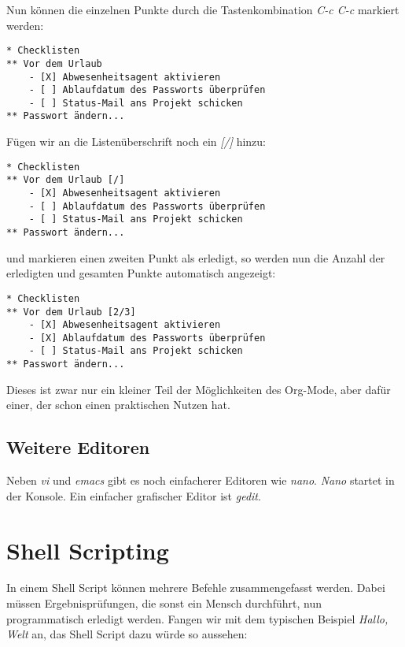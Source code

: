 \documentclass[titlepage,a4paper]{article}
\begin{document}
\noindent
Nun können die einzelnen Punkte durch die Tastenkombination \emph{C-c C-c}
markiert werden:

\begin{verbatim}
* Checklisten
** Vor dem Urlaub
    - [X] Abwesenheitsagent aktivieren
    - [ ] Ablaufdatum des Passworts überprüfen
    - [ ] Status-Mail ans Projekt schicken
** Passwort ändern...
\end{verbatim}

\noindent
Fügen wir an die Listenüberschrift noch ein \emph{[/]} hinzu:

\begin{verbatim}
* Checklisten
** Vor dem Urlaub [/]
    - [X] Abwesenheitsagent aktivieren
    - [ ] Ablaufdatum des Passworts überprüfen
    - [ ] Status-Mail ans Projekt schicken
** Passwort ändern...
\end{verbatim}

\noindent
und markieren einen zweiten Punkt als erledigt,
so werden nun die Anzahl der erledigten und gesamten Punkte automatisch angezeigt:

\begin{verbatim}
* Checklisten
** Vor dem Urlaub [2/3]
    - [X] Abwesenheitsagent aktivieren
    - [X] Ablaufdatum des Passworts überprüfen
    - [ ] Status-Mail ans Projekt schicken
** Passwort ändern...
\end{verbatim}

\noindent
Dieses ist zwar nur ein kleiner Teil der Möglichkeiten des Org-Mode,
aber dafür einer, der schon einen praktischen Nutzen hat.

\subsection{Weitere Editoren}

Neben \emph{vi} und \emph{emacs} gibt es noch einfacherer Editoren wie \emph{nano}.  \emph{Nano} startet
in der Konsole.  Ein einfacher grafischer Editor ist \emph{gedit}.

\section{Shell Scripting}
\label{sec:scripting}

In einem Shell Script können mehrere Befehle zusammengefasst werden.
Dabei müssen Ergebnisprüfungen, die sonst ein Mensch durchführt,
nun programmatisch erledigt werden.
Fangen wir mit dem typischen Beispiel \emph{Hallo, Welt} an,
das Shell Script dazu würde so aussehen:
\end{document}
